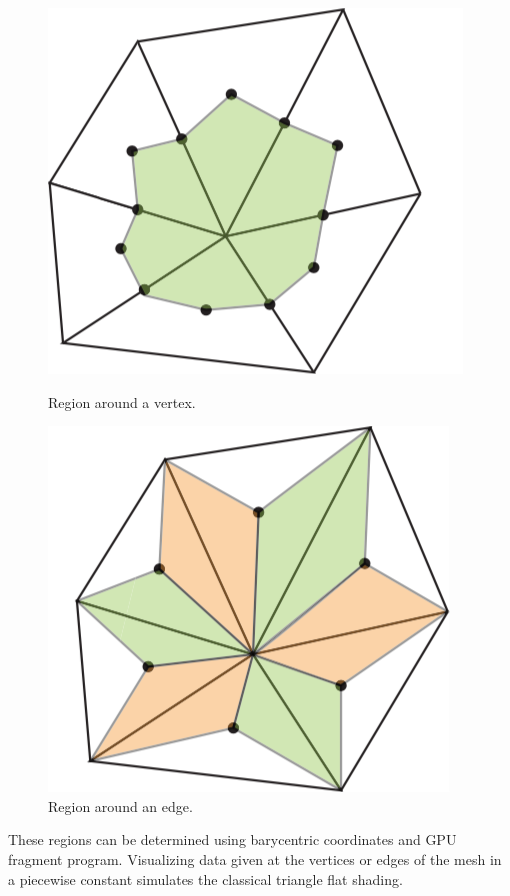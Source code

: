 \documentclass[11pt]{article}
\begin{document}
\begin{figure}[!htb]
  \includegraphics[width=\linewidth]{left.png}
  \caption{Region around a vertex.}\label{fig:left}
\endminipage\hfill
{}
  \includegraphics[width=\linewidth]{right.png}
  \caption{Region around an edge.}\label{fig:right}
\endminipage
\end{figure}
These regions can be determined using barycentric coordinates and GPU fragment program. 
Visualizing data given at the vertices or edges of the mesh in a piecewise constant simulates the classical triangle flat shading.
\end{document}
